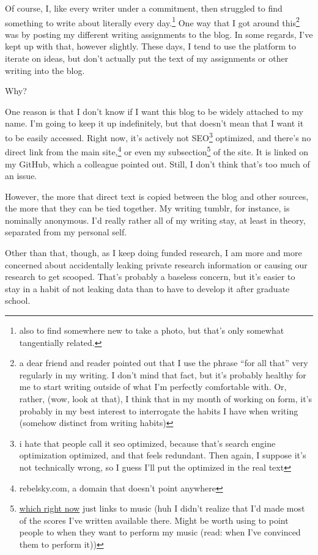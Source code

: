 \documentclass[12pt]{article}[titlepage]
\newcommand{\say}[1]{``#1''}
\newcommand{\1}{\={a}}
\newcommand{\2}{\={e}}
\newcommand{\3}{\={\i}}
\newcommand{\4}{\=o}
\newcommand{\5}{\=u}
\newcommand{\6}{\={A}}
\renewcommand{\,}{\textsuperscript{,}}
\begin{document}
Of course, I, like every writer under a commitment, then struggled to find something to write about literally every day.\footnote{also to find somewhere new to take a photo, but that's only somewhat tangentially related.}
One way that I got around this\footnote{a dear friend and reader pointed out that I use the phrase \say{for all that} very regularly in my writing. I don't mind that fact, but it's probably healthy for me to start writing outside of what I'm perfectly comfortable with. Or, rather, (wow, look at that), I think that in my month of working on form, it's probably in my best interest to interrogate the habits I have when writing (somehow distinct from writing habits)} was by posting my different writing assignments to the blog.
In some regards, I've kept up with that, however slightly.
These days, I tend to use the platform to iterate on ideas, but don't actually put the text of my assignments or other writing into the blog.

Why?

One reason is that I don't know if I want this blog to be widely attached to my name.
I'm going to keep it up indefinitely, but that doesn't mean that I want it to be easily accessed.
Right now, it's actively not SEO\footnote{i hate that people call it seo optimized, because that's search engine optimization optimized, and that feels redundant. Then again, I suppose it's not technically wrong, so I guess I'll put the optimized in the real text} optimized, and there's no direct link from the main site,\footnote{rebelsky.com, a domain that doesn't point anywhere} or even my subsection\footnote{\href{j.rebelsky.com}{which right now} just links to music (huh I didn't realize that I'd made most of the scores I've written available there. Might be worth using to point people to when they want to perform my music (read: when I've convinced them to perform it))} of the site.
It is linked on my GitHub, which a colleague pointed out.
Still, I don't think that's too much of an issue.

However, the more that direct text is copied between the blog and other sources, the more that they can be tied together.
My writing tumblr, for instance, is nominally anonymous.
I'd really rather all of my writing stay, at least in theory, separated from my personal self.

Other than that, though, as I keep doing funded research, I am more and more concerned about accidentally leaking private research information or causing our research to get scooped.
That's probably a baseless concern, but it's easier to stay in a habit of not leaking data than to have to develop it after graduate school.
\end{document}
